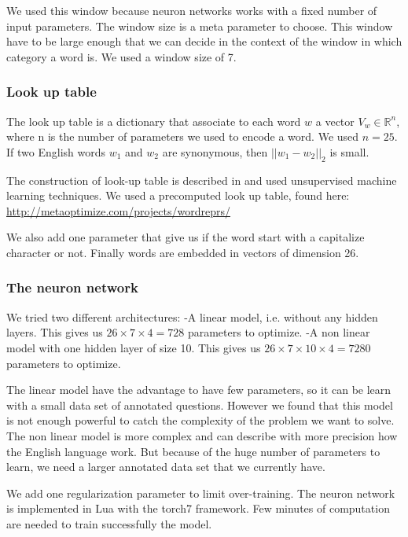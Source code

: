 We used this window because neuron networks works with a fixed number of input parameters. 
The window size is a meta parameter to choose. This window have to be large enough that we can decide in the context of the window in which category a word is. We used a window size of 7.

\subsubsection{Look up table}

The look up table is a dictionary that associate to each word $w$ a vector $V_w \in \mathbb{R}^n$, where n is the number of parameters we used to encode a word. We used $n=25$.
If two English words $w_1$ and $w_2$ are synonymous, then $||w_1-w_2||_2$ is small.

The construction of look-up table is described in \cite{collobert} and used unsupervised machine learning techniques.
We used a precomputed look up table, found here: \url{http://metaoptimize.com/projects/wordreprs/}

We also add one parameter that give us if the word start with a capitalize character or not. Finally words are embedded in vectors of dimension 26. 

\subsubsection{The neuron network}

We tried two different architectures:
-A linear model, i.e. without any hidden layers. This gives us $26\times 7\times 4 = 728$ parameters to optimize. 
-A non linear model with one hidden layer of size 10. This gives us $26\times 7\times 10\times 4 = 7280$ parameters to optimize.

The linear model have the advantage to have few parameters, so it can be learn with a small data set of annotated questions. However we found that this model is not enough powerful to catch the complexity of the problem we want to solve.
The non linear model is more complex and can describe with more precision how the English language work. But because of the huge number of parameters to learn, we need a larger annotated data set that we currently have.

We add one regularization parameter to limit over-training.
The neuron network is implemented in Lua with the torch7 framework.
Few minutes of computation are needed to train successfully the model.

